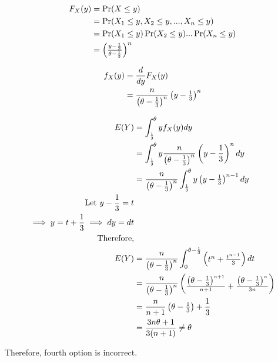 \documentclass{article}[]
\begin{document}
\begin{align}
F_X(y)&=\Pr(X \leq y)\\
&=\Pr(X_1 \leq y, X_2 \leq y,..., X_n \leq y)\\
&=\Pr(X_1 \leq y)\Pr(X_2 \leq y)...\Pr(X_n \leq y)\\
&=\begin{pmatrix}\frac{y-\frac{1}{3}}{\theta-\frac{1}{3}}\end{pmatrix}^n
\end{align}

\begin{align}
f_X(y)&=\frac{d}{dy} F_X(y) \\
&=\frac{n}{\begin{pmatrix}\theta-\frac{1}{3}\end{pmatrix}^n} \begin{pmatrix}y-\frac{1}{3}\end{pmatrix}^n 
\end{align}

\begin{align}
E(Y)&=\int_{\frac{1}{3}}^{\theta} yf_X(y) dy \\ 
&=\int_{\frac{1}{3}}^{\theta} y\frac{n}{\left(\theta-\frac{1}{3}\right)^n} \left(y-\frac{1}{3}\right)^n dy \\ 
&=\frac{n}{\begin{pmatrix}\theta-\frac{1}{3}\end{pmatrix}^n}\int_{\frac{1}{3}}^{\theta} y\begin{pmatrix}y-\frac{1}{3}\end{pmatrix}^{n-1} dy \\ 
\text{Let } y-\frac{1}{3}=t\\
\implies y=t+\frac{1}{3} \implies dy=dt \\
\text{Therefore,}\\
E(Y)&=\frac{n}{\begin{pmatrix}\theta-\frac{1}{3}\end{pmatrix}^n}\int_{0}^{\theta-\frac{1}{3}} \begin{pmatrix}t^n+\frac{t^{n-1}}{3}\end{pmatrix} dt \\
&=\frac{n}{\begin{pmatrix}\theta-\frac{1}{3}\end{pmatrix}^n} \begin{pmatrix}\frac{\begin{pmatrix}\theta-\frac{1}{3}\end{pmatrix}^{n+1}}{n+1} + \frac{\begin{pmatrix}\theta-\frac{1}{3}\end{pmatrix}^n}{3n}\end{pmatrix}\\
&=\frac{n}{n+1}\begin{pmatrix}\theta-\frac{1}{3}\end{pmatrix} + \frac{1}{3}\\
&=\frac{3n\theta + 1}{3(n+1)} \neq \theta
\end{align}

Therefore, fourth option is incorrect.
\end{document}
